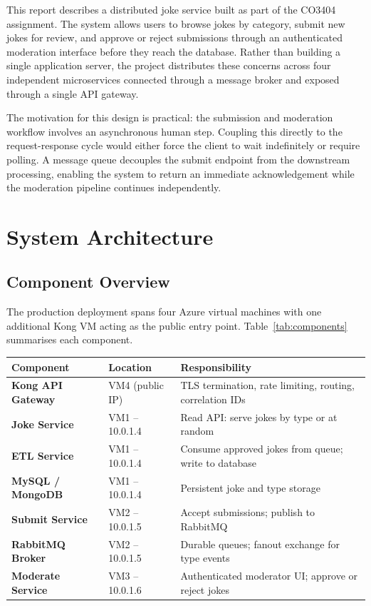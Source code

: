 \documentclass[12pt,a4paper]{article}
\begin{document}
This report describes a distributed joke service built as part of the CO3404 assignment. The system allows users to browse jokes by category, submit new jokes for review, and approve or reject submissions through an authenticated moderation interface before they reach the database. Rather than building a single application server, the project distributes these concerns across four independent microservices connected through a message broker and exposed through a single API gateway.

The motivation for this design is practical: the submission and moderation workflow involves an asynchronous human step. Coupling this directly to the request-response cycle would either force the client to wait indefinitely or require polling. A message queue decouples the submit endpoint from the downstream processing, enabling the system to return an immediate acknowledgement while the moderation pipeline continues independently.

\section{System Architecture}

\subsection{Component Overview}

The production deployment spans four Azure virtual machines with one additional Kong VM acting as the public entry point. Table~\ref{tab:components} summarises each component.

\begin{center}
\small
\begin{tabular}{>{\bfseries}p{3.5cm} p{3.0cm} p{5.8cm}}
  \toprule
  Component & Location & Responsibility \\
  \midrule
  Kong API Gateway  & VM4 (public IP)  & TLS termination, rate limiting, routing, correlation IDs \\
  Joke Service      & VM1 -- 10.0.1.4  & Read API: serve jokes by type or at random \\
  ETL Service       & VM1 -- 10.0.1.4  & Consume approved jokes from queue; write to database \\
  MySQL / MongoDB   & VM1 -- 10.0.1.4  & Persistent joke and type storage \\
  Submit Service    & VM2 -- 10.0.1.5  & Accept submissions; publish to RabbitMQ \\
  RabbitMQ Broker   & VM2 -- 10.0.1.5  & Durable queues; fanout exchange for type events \\
  Moderate Service  & VM3 -- 10.0.1.6  & Authenticated moderator UI; approve or reject jokes \\
  \bottomrule
\end{tabular}
\end{center}
\end{document}
